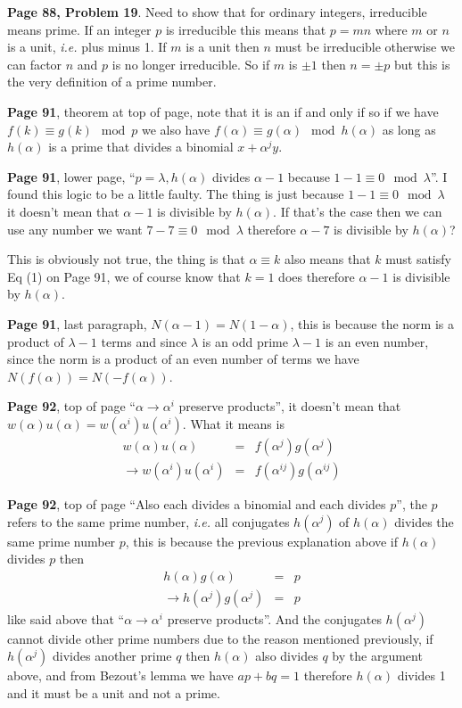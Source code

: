 \documentclass[aps,preprint,preprintnumbers,nofootinbib,showpacs,prd]{revtex4-1}
\newcommand{\ie}{{\it i.e.} }
\newcommand{\nbea}{\begin{eqnarray*}}
\newcommand{\neea}{\end{eqnarray*}}
\begin{document}
{\bf Page 88, Problem 19}. Need to show that for ordinary integers, irreducible means prime. If an integer $p$ is irreducible this means that $p = mn$ where $m$ or $n$ is a unit, \ie plus minus 1. If $m$ is a unit then $n$ must be irreducible otherwise we can factor $n$ and $p$ is no longer irreducible. So if $m$ is $\pm1$ then $n = \pm p$ but this is the very definition of a prime number.

{\bf Page 91}, theorem at top of page, note that it is an if and only if so if we have $f(k) \equiv g(k) \mod{p}$ we also have $f(\alpha) \equiv g(\alpha) \mod{h(\alpha)}$ as long as $h(\alpha)$ is a prime that divides a binomial $x + \alpha^j y$.

{\bf Page 91}, lower page, ``$p = \lambda, h(\alpha)$ divides $\alpha - 1$ because $1-1 \equiv 0 \mod{\lambda}$''. I found this logic to be a little faulty. The thing is just because $1 - 1 \equiv 0 \mod{\lambda}$ it doesn't mean that $\alpha - 1$ is divisible by $h(\alpha)$. If that's the case then we can use any number we want $7 - 7 \equiv 0 \mod{\lambda}$ therefore $\alpha - 7$ is divisible by $h(\alpha)$?

This is obviously not true, the thing is that $\alpha \equiv k$ also means that $k$ must satisfy Eq (1) on Page 91, we of course know that $k=1$ does therefore $\alpha - 1$ is divisible by $h(\alpha)$.

{\bf Page 91}, last paragraph, $N(\alpha - 1) = N(1 - \alpha)$, this is because the norm is a product of $\lambda - 1$ terms and since $\lambda$ is an odd prime $\lambda - 1$ is an even number, since the norm is a product of an even number of terms we have $N(f(\alpha)) = N(-f(\alpha))$.

{\bf Page 92}, top of page ``$\alpha \to \alpha^i$ preserve products'', it doesn't mean that $w(\alpha)u(\alpha) = w(\alpha^i)u(\alpha^i)$. What it means is
%
\nbea
w(\alpha)u(\alpha) & = & f(\alpha^j)g(\alpha^j) \\
\to w(\alpha^i)u(\alpha^i) & = & f(\alpha^{ij})g(\alpha^{ij})
\neea
%

{\bf Page 92}, top of page ``Also each divides a binomial and each divides $p$'', the $p$ refers to the same prime number, \ie all conjugates $h(\alpha^j)$ of $h(\alpha)$ divides the same prime number $p$, this is because the previous explanation above if $h(\alpha)$ divides $p$ then
%
\nbea
h(\alpha) g(\alpha) & = & p \\
\to h(\alpha^j) g(\alpha^j) & = & p
\neea
%
like said above that ``$\alpha \to \alpha^i$ preserve products''. And the conjugates $h(\alpha^j)$ cannot divide other prime numbers due to the reason mentioned previously, if $h(\alpha^j)$ divides another prime $q$ then $h(\alpha)$ also divides $q$ by the argument above, and from Bezout's lemma we have $ap + bq = 1$ therefore $h(\alpha)$ divides 1 and it must be a unit and not a prime. 
\end{document}
